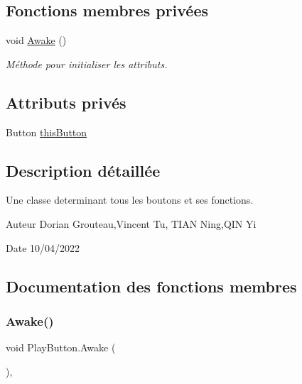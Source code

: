 \subsection*{Fonctions membres privées}
\begin{DoxyCompactItemize}
\item 
void \mbox{\hyperlink{class_play_button_a3ad21762e32cca95a7e7b1979aea4fc0}{Awake}} ()
\begin{DoxyCompactList}\small\item\em Méthode pour initialiser les attributs. \end{DoxyCompactList}\end{DoxyCompactItemize}
\subsection*{Attributs privés}
\begin{DoxyCompactItemize}
\item 
Button \mbox{\hyperlink{class_play_button_a2c13864ecb338779b949a59c3294b038}{this\+Button}}
\end{DoxyCompactItemize}


\subsection{Description détaillée}
Une classe determinant tous les boutons et ses fonctions. 

\begin{DoxyAuthor}{Auteur}
Dorian Grouteau,Vincent Tu, T\+I\+AN Ning,Q\+IN Yi 
\end{DoxyAuthor}
\begin{DoxyDate}{Date}
10/04/2022 
\end{DoxyDate}


\subsection{Documentation des fonctions membres}
\mbox{\label{class_play_button_a3ad21762e32cca95a7e7b1979aea4fc0}} 
\subsubsection{\texorpdfstring{Awake()}{Awake()}}
{\footnotesize\ttfamily void Play\+Button.\+Awake (\begin{DoxyParamCaption}{ }\end{DoxyParamCaption})\hspace{0.3cm}{\ttfamily [inline]}, {\ttfamily [private]}}



